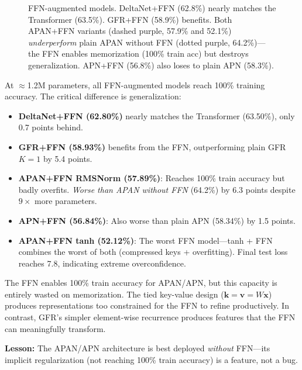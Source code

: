 \documentclass[11pt,a4paper]{article}
\begin{document}
\begin{figure}[h]
\caption{FFN-augmented models. DeltaNet+FFN (62.8\%) nearly matches the Transformer (63.5\%). GFR+FFN (58.9\%) benefits. Both APAN+FFN variants (dashed purple, 57.9\% and 52.1\%) \emph{underperform} plain APAN without FFN (dotted purple, 64.2\%)---the FFN enables memorization (100\% train acc) but destroys generalization. APN+FFN (56.8\%) also loses to plain APN (58.3\%).}
\label{fig:ffn}
\end{figure}

At $\approx$1.2M parameters, all FFN-augmented models reach 100\% training accuracy.
The critical difference is generalization:
\begin{itemize}
\item \textbf{DeltaNet+FFN (62.80\%)} nearly matches the Transformer (63.50\%), only 0.7 points behind.
\item \textbf{GFR+FFN (58.93\%)} benefits from the FFN, outperforming plain GFR $K{=}1$ by 5.4 points.
\item \textbf{APAN+FFN RMSNorm (57.89\%)}: Reaches 100\% train accuracy but badly overfits. \emph{Worse than APAN without FFN} (64.2\%) by 6.3 points despite $9\times$ more parameters.
\item \textbf{APN+FFN (56.84\%)}: Also worse than plain APN (58.34\%) by 1.5 points.
\item \textbf{APAN+FFN tanh (52.12\%)}: The worst FFN model---tanh + FFN combines the worst of both (compressed keys + overfitting). Final test loss reaches 7.8, indicating extreme overconfidence.
\end{itemize}
The FFN enables 100\% train accuracy for APAN/APN, but this capacity is entirely wasted on memorization.
The tied key-value design ($\mathbf{k} = \mathbf{v} = W\mathbf{x}$) produces representations too constrained for the FFN to refine productively.
In contrast, GFR's simpler element-wise recurrence produces features that the FFN can meaningfully transform.

\textbf{Lesson:} The APAN/APN architecture is best deployed \emph{without} FFN---its implicit regularization (not reaching 100\% train accuracy) is a feature, not a bug.
\end{document}
